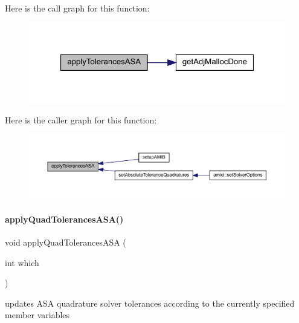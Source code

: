 Here is the call graph for this function\+:
\nopagebreak
\begin{figure}[H]
\begin{center}
\leavevmode
\includegraphics[width=321pt]{classamici_1_1_solver_abdf8989d57153fde8988e73a98979297_cgraph}
\end{center}
\end{figure}
Here is the caller graph for this function\+:
\nopagebreak
\begin{figure}[H]
\begin{center}
\leavevmode
\includegraphics[width=350pt]{classamici_1_1_solver_abdf8989d57153fde8988e73a98979297_icgraph}
\end{center}
\end{figure}
\mbox{\label{classamici_1_1_solver_a09d47957ba70f725efb5e3a385a274a6}} 
\paragraph{\texorpdfstring{apply\+Quad\+Tolerances\+A\+S\+A()}{applyQuadTolerancesASA()}}
{\footnotesize\ttfamily void apply\+Quad\+Tolerances\+A\+SA (\begin{DoxyParamCaption}\item[{int}]{which }\end{DoxyParamCaption})\hspace{0.3cm}{\ttfamily [protected]}}

updates A\+SA quadrature solver tolerances according to the currently specified member variables


